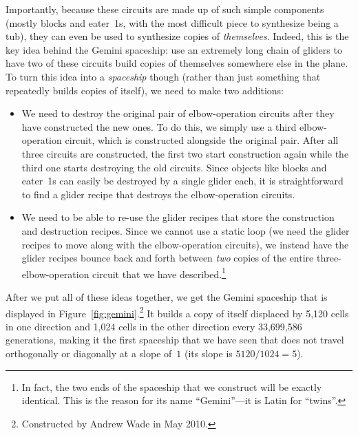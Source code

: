 Importantly, because these circuits are made up of such simple components (mostly blocks and eater~1s, with the most difficult piece to synthesize being a tub), they can even be used to synthesize copies of \emph{themselves}. Indeed, this is the key idea behind the Gemini spaceship: use an extremely long chain of gliders to have two of these circuits build copies of themselves somewhere else in the plane. To turn this idea into a \emph{spaceship} though (rather than just something that repeatedly builds copies of itself), we need to make two additions:\smallskip

\begin{itemize}
	\item[1)] We need to destroy the original pair of elbow-operation circuits after they have constructed the new ones. To do this, we simply use a third elbow-operation circuit, which is constructed alongside the original pair. After all three circuits are constructed, the first two start construction again while the third one starts destroying the old circuits. Since objects like blocks and eater~1s can easily be destroyed by a single glider each, it is straightforward to find a glider recipe that destroys the elbow-operation circuits.\smallskip
	
	\item[2)] We need to be able to re-use the glider recipes that store the construction and destruction recipes. Since we cannot use a static loop (we need the glider recipes to move along with the elbow-operation circuits), we instead have the glider recipes bounce back and forth between \emph{two} copies of the entire three-elbow-operation circuit that we have described.\footnote{In fact, the two ends of the spaceship that we construct will be exactly identical. This is the reason for its name ``Gemini''---it is Latin for ``twins''.}\smallskip
\end{itemize}

After we put all of these ideas together, we get the Gemini spaceship that is displayed in Figure~\ref{fig:gemini}.\footnote{Constructed by Andrew Wade in May 2010.} It builds a copy of itself displaced by 5,120 cells in one direction and 1,024 cells in the other direction every 33,699,586 generations, making it the first spaceship that we have seen that does not travel orthogonally or diagonally at a slope of~$1$ (its slope is $5120/1024 = 5$).

